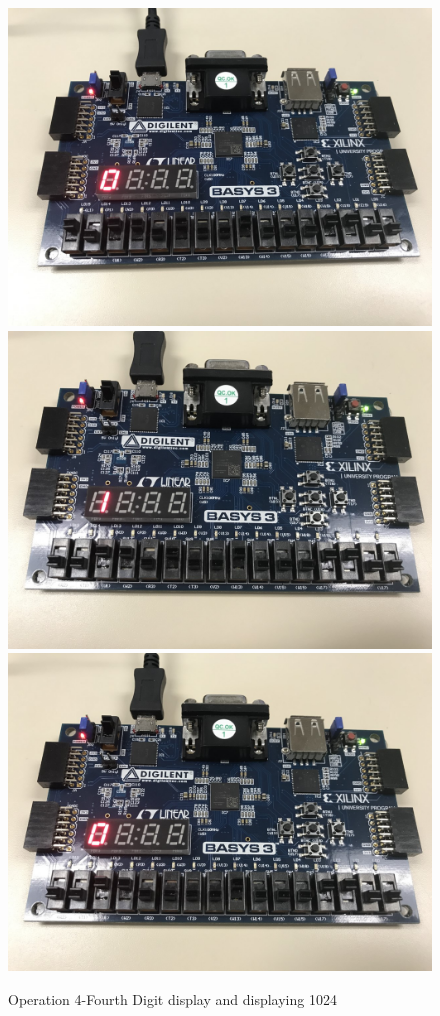 \documentclass[11pt]{article}
\begin{document}
\begin{figure}[ht]\centering
	\includegraphics[angle=90, width=.6\textwidth]{op4_1.jpg}
	\includegraphics[angle=90, width=.6\textwidth]{op4_2.jpg}
	\includegraphics[angle=90, width=.6\textwidth]{op4_3.jpg}
	\caption{Operation 4-Fourth Digit display and displaying 1024}
	\label{fig:sim_with_table}
\end{figure}
\clearpage
\end{document}

